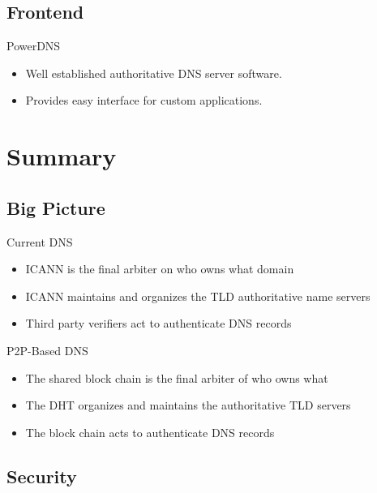\documentclass[11pt]{beamer}
\begin{document}
\subsection{Frontend}
\begin{frame}{PowerDNS}
\begin{itemize}
	\item Well established authoritative DNS server software.
	
	\item Provides easy interface for custom applications.
	
\end{itemize}
\end{frame}

\section{Summary}

\subsection{Big Picture}

\begin{frame}{Current DNS}

	\begin{itemize}
		\item ICANN is the final arbiter on who owns what domain
		\item ICANN maintains and organizes the TLD authoritative name servers
		\item Third party verifiers act to authenticate DNS records
	
	\end{itemize}


\end{frame}



\begin{frame}{P2P-Based DNS}

	\begin{itemize}
		\item The shared block chain is the final arbiter of who owns what
		\item The DHT organizes and maintains the authoritative TLD servers
		\item The block chain acts to authenticate DNS records
	\end{itemize}


\end{frame}

\subsection{Security}
\end{document}

